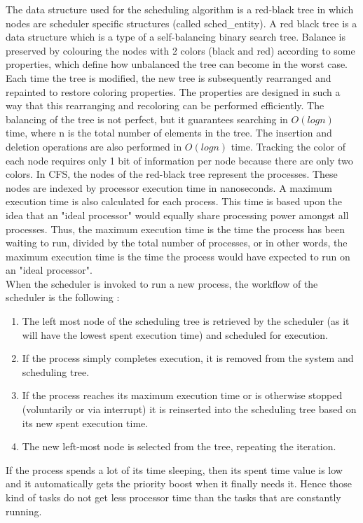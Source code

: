 \documentclass[diploma]{Styles/softlab-thesis}
\begin{document}
The data structure used for the scheduling algorithm is a red-black tree in which nodes are scheduler specific structures (called sched\_entity). A red black tree is a data structure which is a type of a self-balancing binary search tree. Balance is preserved by colouring the nodes with 2 colors (black and red) according to some properties, which define how unbalanced the tree can become in the worst case. Each time the tree is modified, the new tree is subsequently rearranged and repainted to restore coloring properties. The properties are designed in such a way that this rearranging and recoloring can be performed efficiently. The balancing of the tree is not perfect, but it guarantees searching in $O(logn)$ time, where n is the total number of elements in the tree. The insertion and deletion operations are also performed in $O(logn)$ time. Tracking the color of each node requires only 1 bit of information per node because there are only two colors. In CFS, the nodes of the red-black tree represent the processes. These nodes are indexed by processor execution time in nanoseconds. A maximum execution time is also calculated for each process. This time is based upon the idea that an "ideal processor" would equally share processing power amongst all processes. Thus, the maximum execution time is the time the process has been waiting to run, divided by the total number of processes, or in other words, the maximum execution time is the time the process would have expected to run on an "ideal processor". \\

When the scheduler is invoked to run a new process, the workflow of the scheduler is the following :
\begin{enumerate}
    \item The left most node of the scheduling tree is retrieved by the scheduler (as it will have the lowest spent execution time) and scheduled for execution.
    \item If the process simply completes execution, it is removed from the system and scheduling tree.
    \item If the process reaches its maximum execution time or is otherwise stopped (voluntarily or via interrupt) it is reinserted into the scheduling tree based on its new spent execution time.
    \item The new left-most node is selected from the tree, repeating the iteration.
\end{enumerate}

If the process spends a lot of its time sleeping, then its spent time value is low and it automatically gets the priority boost when it finally needs it. Hence those kind of tasks do not get less processor time than the tasks that are constantly running.
\end{document}
